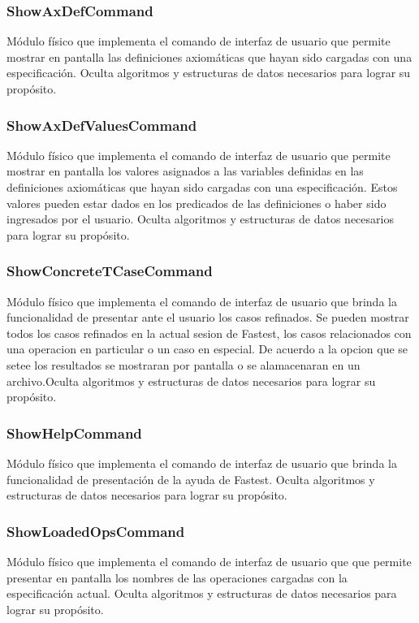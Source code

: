 \documentclass[a4paper,10pt]{report}
\begin{document}
			\subsubsection{ShowAxDefCommand}
			Módulo físico que implementa el comando de interfaz de usuario que permite mostrar en pantalla las definiciones axiomáticas que hayan sido cargadas con una especificación. Oculta algoritmos y estructuras de datos necesarios para lograr su propósito.
			\subsubsection{ShowAxDefValuesCommand}
			Módulo físico que implementa el comando de interfaz de usuario que permite mostrar en pantalla los valores asignados a las variables definidas en las definiciones axiomáticas que hayan sido cargadas con una especificación. Estos valores pueden estar dados en los predicados de las definiciones o haber sido ingresados por el usuario. Oculta algoritmos y estructuras de datos necesarios para lograr su propósito.
			\subsubsection{ShowConcreteTCaseCommand}
			Módulo físico que implementa el comando de interfaz de usuario que brinda la funcionalidad de presentar ante el usuario los casos refinados. Se pueden mostrar todos los casos refinados en la actual sesion de Fastest, los casos relacionados con una operacion en particular o un caso en especial. De acuerdo a la opcion que se setee los resultados se mostraran por pantalla o se alamacenaran en un archivo.Oculta algoritmos y estructuras de datos necesarios para lograr su propósito.
			\subsubsection{ShowHelpCommand}
			Módulo físico que implementa el comando de interfaz de usuario que brinda la funcionalidad de presentación de la ayuda de Fastest. Oculta algoritmos y estructuras de datos necesarios para lograr su propósito.
			\subsubsection{ShowLoadedOpsCommand}
			Módulo físico que implementa el comando de interfaz de usuario que que permite presentar en pantalla los nombres de las operaciones cargadas con la especificación actual. Oculta algoritmos y estructuras de datos necesarios para lograr su propósito.
\end{document}
